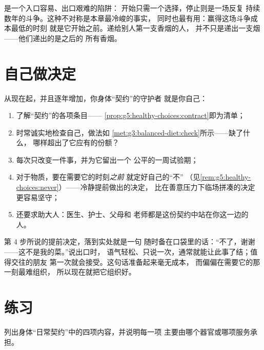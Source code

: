 \begin{remark}\label{rem:g5:healthy-choices:never}
是一个入口容易、出口艰难的陷阱：
开始只需一个选择，停止则是一场反复
持续数年的斗争。这种不对称是本章最冷峻的事实，
同时也最有用：赢得这场斗争成本最低的时刻
就是它开始之前。递给别人第一支香烟的人，
并不只是递出一支烟——他们递出的是之后的
所有香烟。
\end{remark}

\section{自己做决定}

\begin{method}[自己执行身体的“契约”]\label{met:g5:healthy-choices:run}
从现在起，并且逐年增加，你身体“契约”的守护者
就是你自己：
\begin{enumerate}
  \item 了解“契约”的各项条目——
        \cref{prop:g5:healthy-choices:contract}即为清单；
  \item 时常诚实地检查自己，做法如
        \cref{met:g3:balanced-diet:check}所示——缺了什么，
        哪样超出了它应有的份额？
  \item 每次只改变一件事，并为它留出一个
        公平的一周试验期；
  \item 对于物质，要在需要它的时刻\emph{之前}
        就定好自己的“不”
        （见\cref{rem:g5:healthy-choices:never}）——冷静提前做出的决定，
        比在善意压力下临场拼凑的决定
        更容易坚守；
  \item 还要求助大人：医生、护士、父母和
        老师都是这份契约中站在你这一边的人。
\end{enumerate}
\end{method}

\begin{example}[事先准备好的回答]\label{ex:g5:healthy-choices:answers}
第 4 步所说的提前决定，落到实处就是一句
随时备在口袋里的话：“不了，谢谢——这不是我的菜。”说出口时，
语气轻松、只说一次，通常就能让此事了结；值得交往的朋友
第一次就会接受。这句话准备起来毫无成本，
而偏偏在需要它的那一刻最难组织，
所以现在就把它组织好。
\end{example}

\section{练习}

\begin{exercise}[$\star$]\label{exo:g5:healthy-choices:1}
列出身体“日常契约”中的四项内容，并说明每一项
主要由哪个器官或哪项服务承担。
\end{exercise}

